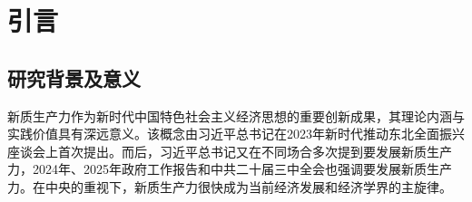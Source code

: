 
\chapter{引言}

\section{研究背景及意义}

新质生产力作为新时代中国特色社会主义经济思想的重要创新成果，其理论内涵与实践价值具有深远意义。该概念由习近平总书记在2023年新时代推动东北全面振兴座谈会上首次提出\cite{YinBoGuLaoLaoBaWoDongBeiDeChongYaoShiMingFenLiPuXieDongBeiQuanMianZhenXingXinPianZhang2023}。而后，习近平总书记又在不同场合多次提到要发展新质生产力，2024年\cite[17]{LiQiangZhengFuGongZuoBaoGao2024Nian3Yue5RiZaiDiShiSiJieQuanGuoRenMinDaiBiaoDaHuiDiErCiHuiYiShang2024}、2025年\cite[19]{LiQiangZhengFuGongZuoBaoGao2025Nian3Yue5RiZaiDiShiSiJieQuanGuoRenMinDaiBiaoDaHuiDiSanCiHuiYiShang2025}政府工作报告和中共二十届三中全会\cite[8]{ZhongGuoGongChanDangDiErShiJieZhongYangWeiYuanHuiDiSanCiQuanTiHuiYiGongBao2024}也强调要发展新质生产力。在中央的重视下，新质生产力很快成为当前经济发展和经济学界的主旋律。

